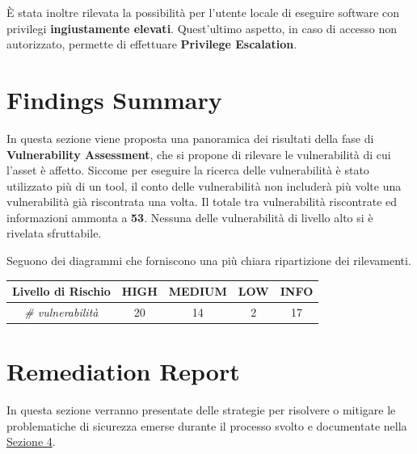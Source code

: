 \documentclass[a4paper, 12pt, oneside]{article}
\begin{document}
È stata inoltre rilevata la possibilità per l'utente locale di eseguire software con privilegi \textbf{ingiustamente elevati}. Quest'ultimo aspetto, in caso di accesso non autorizzato, permette di effettuare \textbf{Privilege Escalation}.

\newpage
\section{Findings Summary}
In questa sezione viene proposta una panoramica dei risultati della fase di \textbf{Vulnerability Assessment}, che si propone di rilevare le vulnerabilità di cui l'asset è affetto. Siccome per eseguire la ricerca delle vulnerabilità è stato utilizzato più di un tool, il conto delle vulnerabilità non includerà più volte una vulnerabilità già riscontrata una volta. Il totale tra vulnerabilità riscontrate ed informazioni ammonta a \textbf{53}. Nessuna delle vulnerabilità di livello alto si è rivelata sfruttabile.

Seguono dei diagrammi che forniscono una più chiara ripartizione dei rilevamenti.

\vspace{15mm}
    \begin{table}[h!]
        \centering
        \begin{tabular}{|l|l|l|l|l|}
            \hline
            Livello di Rischio                              & \cellcolor[HTML]{FE0000}HIGH & \cellcolor[HTML]{FFCC67}MEDIUM & \cellcolor[HTML]{34FF34}LOW & \cellcolor[HTML]{34CDF9}INFO \\ \hline
            \multicolumn{1}{|c|}{\textit{\# vulnerabilità}} & \multicolumn{1}{c|}{20}      & \multicolumn{1}{c|}{14}        & \multicolumn{1}{c|}{2}      & \multicolumn{1}{c|}{17}      \\ \hline
        \end{tabular}
    \end{table}
    \vspace{15mm}
    \begin{center}
    \end{center}
        
\newpage

\section{Remediation Report}
In questa sezione verranno presentate delle strategie per risolvere o mitigare le problematiche di sicurezza emerse durante il processo svolto e documentate nella \hyperref[sec:vulnrep]{Sezione 4}.
\end{document}
